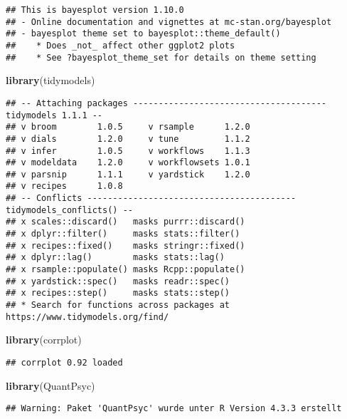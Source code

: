 \documentclass[
]{article}
\newenvironment{Shaded}{\begin{snugshade}}{\end{snugshade}}
\newcommand{\FunctionTok}[1]{\textcolor[rgb]{0.13,0.29,0.53}{\textbf{#1}}}
\newcommand{\NormalTok}[1]{#1}
\begin{document}
\begin{verbatim}
## This is bayesplot version 1.10.0
## - Online documentation and vignettes at mc-stan.org/bayesplot
## - bayesplot theme set to bayesplot::theme_default()
##    * Does _not_ affect other ggplot2 plots
##    * See ?bayesplot_theme_set for details on theme setting
\end{verbatim}

\begin{Shaded}
\begin{Highlighting}[]
\FunctionTok{library}\NormalTok{(tidymodels)}
\end{Highlighting}
\end{Shaded}

\begin{verbatim}
## -- Attaching packages -------------------------------------- tidymodels 1.1.1 --
## v broom        1.0.5     v rsample      1.2.0
## v dials        1.2.0     v tune         1.1.2
## v infer        1.0.5     v workflows    1.1.3
## v modeldata    1.2.0     v workflowsets 1.0.1
## v parsnip      1.1.1     v yardstick    1.2.0
## v recipes      1.0.8     
## -- Conflicts ----------------------------------------- tidymodels_conflicts() --
## x scales::discard()   masks purrr::discard()
## x dplyr::filter()     masks stats::filter()
## x recipes::fixed()    masks stringr::fixed()
## x dplyr::lag()        masks stats::lag()
## x rsample::populate() masks Rcpp::populate()
## x yardstick::spec()   masks readr::spec()
## x recipes::step()     masks stats::step()
## * Search for functions across packages at https://www.tidymodels.org/find/
\end{verbatim}

\begin{Shaded}
\begin{Highlighting}[]
\FunctionTok{library}\NormalTok{(corrplot)}
\end{Highlighting}
\end{Shaded}

\begin{verbatim}
## corrplot 0.92 loaded
\end{verbatim}

\begin{Shaded}
\begin{Highlighting}[]
\FunctionTok{library}\NormalTok{(QuantPsyc)}
\end{Highlighting}
\end{Shaded}

\begin{verbatim}
## Warning: Paket 'QuantPsyc' wurde unter R Version 4.3.3 erstellt
\end{verbatim}
\end{document}
